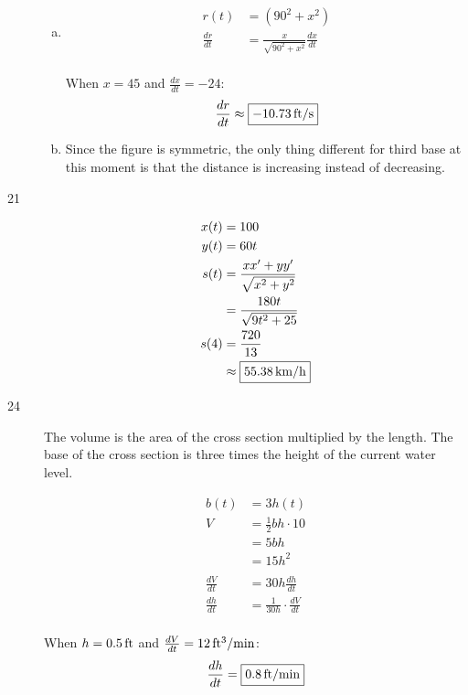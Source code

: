 \documentclass[letterpaper, landscape]{exam}
\begin{document}
\begin{description}
\begin{enumerate}[(a)]
        \item 
          \begin{align*}
            r(t)          & = \left( 90^2 + x^2 \right) \\
            \frac{dr}{dt} & = \frac{x}{\sqrt{90^2 + x^2}} \frac{dx}{dt} \\
          \end{align*}

          When $x = 45$ and $\frac{dx}{dt} = -24$:
          \[
            \frac{dr}{dt} \approx \boxed{ \unit[-10.73]{ft/s} }
          \]

        \item Since the figure is symmetric, the only thing different for third base at this moment
          is that the distance is increasing instead of decreasing.

      \end{enumerate}

    \item[21]
      \begin{align*}
        x(t) & = 100 \\
        y(t) & = 60t \\
        s(t) & = \frac{xx' + yy'}{\sqrt{x^2 + y^2}} \\
             & = \frac{180t}{\sqrt{9t^2 + 25}}
        \\
        s(4) & = \frac{720}{13} \\
             & \approx \boxed{ \unit[55.38]{km/h} } \\
      \end{align*}

    \item[24]
      The volume is the area of the cross section multiplied by the length. The base of the cross
      section is three times the height of the current water level.

      \begin{align*}
        b(t) & = 3 h(t) \\
        V    & = \frac{1}{2} bh \cdot 10 \\
             & = 5bh \\
             & = 15 h^2 \\
        \\
        \frac{dV}{dt} &= 30 h \frac{dh}{dt} \\
        \frac{dh}{dt} &= \frac{1}{30 h} \cdot \frac{dV}{dt} \\
      \end{align*}

      When $h = \unit[0.5]{ft}$ and $\frac{dV}{dt} = \unit[12]{ft^3/min}$:
      \[
        \frac{dh}{dt} = \boxed{ \unit[0.8]{ft/min} }
      \]

  \end{description}
\end{document}
